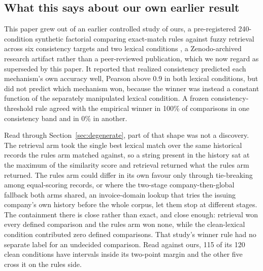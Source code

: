 \documentclass[11pt]{article}
\begin{document}
\subsection{What this says about our own earlier result}
\label{sec:earlier-synthetic}

This paper grew out of an earlier controlled study of ours, a pre-registered
240-condition synthetic factorial comparing exact-match rules against fuzzy
retrieval across six consistency targets and two lexical conditions
\citep{adscascade2026}, a Zenodo-archived research artifact rather than a
peer-reviewed publication, which we now regard as superseded by this paper. It
reported that realized consistency predicted
each mechanism's own accuracy well, Pearson above 0.9 in both lexical
conditions, but did not predict which mechanism won, because the winner was
instead a constant function of the separately manipulated lexical condition. A
frozen consistency-threshold rule agreed with the empirical winner in 100\% of
comparisons in one consistency band and in 0\% in another.

Read through Section~\ref{sec:degenerate}, part of that shape was not a
discovery. The retrieval arm took the single best lexical match over the same
historical records the rules arm matched against, so a string present in the
history sat at the maximum of the similarity score and retrieval returned what
the rules arm returned. The rules arm could differ in its own favour only
through tie-breaking among equal-scoring records, or where the two-stage
company-then-global fallback both arms shared, an invoice-domain lookup that
tries the issuing company's own history before the whole corpus, let them stop
at different stages. The containment there is close rather than exact, and
close enough: retrieval won every defined comparison and the rules arm won
none, while the clean-lexical condition contributed zero defined comparisons.
That study's winner rule had no separate label for an undecided comparison.
Read against ours, 115 of its 120 clean conditions have intervals inside its
two-point margin and the other five cross it on the rules side.
\end{document}
